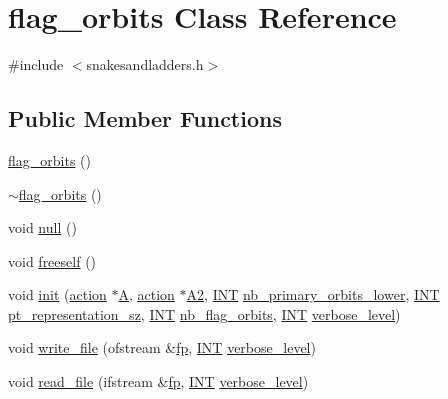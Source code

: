 \hypertarget{classflag__orbits}{}\section{flag\+\_\+orbits Class Reference}
\label{classflag__orbits}


{\ttfamily \#include $<$snakesandladders.\+h$>$}

\subsection*{Public Member Functions}
\begin{DoxyCompactItemize}
\item 
\mbox{\hyperlink{classflag__orbits_a466ce692272f2faf2507cd355c1232ad}{flag\+\_\+orbits}} ()
\item 
\mbox{\hyperlink{classflag__orbits_ac0f8f26b0bf8b4b02f7aff6f54f79bab}{$\sim$flag\+\_\+orbits}} ()
\item 
void \mbox{\hyperlink{classflag__orbits_ac4838e24c9f7bde2bcf960be531285ce}{null}} ()
\item 
void \mbox{\hyperlink{classflag__orbits_a05df171bfae44cbb7a8a007c570c69d8}{freeself}} ()
\item 
void \mbox{\hyperlink{classflag__orbits_a3319b31077e33267f1170b5febf07068}{init}} (\mbox{\hyperlink{classaction}{action}} $\ast$\mbox{\hyperlink{classflag__orbits_a5b0add6f87d948d0fa33f413f362efc1}{A}}, \mbox{\hyperlink{classaction}{action}} $\ast$\mbox{\hyperlink{classflag__orbits_ad9dd12f445b975a5743c5017ce6cc601}{A2}}, \mbox{\hyperlink{galois_8h_a09fddde158a3a20bd2dcadb609de11dc}{I\+NT}} \mbox{\hyperlink{classflag__orbits_a63e0d819bc1b23a68bf6716bb338c42c}{nb\+\_\+primary\+\_\+orbits\+\_\+lower}}, \mbox{\hyperlink{galois_8h_a09fddde158a3a20bd2dcadb609de11dc}{I\+NT}} \mbox{\hyperlink{classflag__orbits_a65897e01ca3bc947cf74addf2bec043b}{pt\+\_\+representation\+\_\+sz}}, \mbox{\hyperlink{galois_8h_a09fddde158a3a20bd2dcadb609de11dc}{I\+NT}} \mbox{\hyperlink{classflag__orbits_ad7a5b645f75c41cf7aa6418594a7f060}{nb\+\_\+flag\+\_\+orbits}}, \mbox{\hyperlink{galois_8h_a09fddde158a3a20bd2dcadb609de11dc}{I\+NT}} \mbox{\hyperlink{simeon_8_c_a818073fbcc2f439e7c56952f67386122}{verbose\+\_\+level}})
\item 
void \mbox{\hyperlink{classflag__orbits_ab78ccdf1556f304c033dda914a6b381b}{write\+\_\+file}} (ofstream \&\mbox{\hyperlink{k__arc__lifting_8_c_a67cc9fbd0817c2d140368e5ed1f2a44d}{fp}}, \mbox{\hyperlink{galois_8h_a09fddde158a3a20bd2dcadb609de11dc}{I\+NT}} \mbox{\hyperlink{simeon_8_c_a818073fbcc2f439e7c56952f67386122}{verbose\+\_\+level}})
\item 
void \mbox{\hyperlink{classflag__orbits_af039682144f9ad076b151a3307990486}{read\+\_\+file}} (ifstream \&\mbox{\hyperlink{k__arc__lifting_8_c_a67cc9fbd0817c2d140368e5ed1f2a44d}{fp}}, \mbox{\hyperlink{galois_8h_a09fddde158a3a20bd2dcadb609de11dc}{I\+NT}} \mbox{\hyperlink{simeon_8_c_a818073fbcc2f439e7c56952f67386122}{verbose\+\_\+level}})
\end{DoxyCompactItemize}
